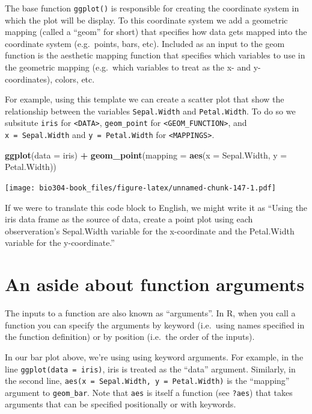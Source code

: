 \documentclass[]{book}
\newenvironment{Shaded}{\begin{snugshade}}{\end{snugshade}}
\newcommand{\DataTypeTok}[1]{\textcolor[rgb]{0.13,0.29,0.53}{#1}}
\newcommand{\KeywordTok}[1]{\textcolor[rgb]{0.13,0.29,0.53}{\textbf{#1}}}
\newcommand{\NormalTok}[1]{#1}
\newcommand{\OperatorTok}[1]{\textcolor[rgb]{0.81,0.36,0.00}{\textbf{#1}}}
\newcommand{\StringTok}[1]{\textcolor[rgb]{0.31,0.60,0.02}{#1}}
\theoremstyle{definition}
\theoremstyle{definition}
\theoremstyle{definition}
\theoremstyle{remark}
\begin{document}
The base function \texttt{ggplot()} is responsible for creating the
coordinate system in which the plot will be display. To this coordinate
system we add a geometric mapping (called a ``geom'' for short) that
specifies how data gets mapped into the coordinate system (e.g.~points,
bars, etc). Included as an input to the geom function is the aesthetic
mapping function that specifies which variables to use in the geometric
mapping (e.g.~which variables to treat as the x- and y-coordinates),
colors, etc.

For example, using this template we can create a scatter plot that show
the relationship between the variables \texttt{Sepal.Width} and
\texttt{Petal.Width}. To do so we subsitute \texttt{iris} for
\texttt{\textless{}DATA\textgreater{}}, \texttt{geom\_point} for
\texttt{\textless{}GEOM\_FUNCTION\textgreater{}}, and
\texttt{x\ =\ Sepal.Width} and \texttt{y\ =\ Petal.Width} for
\texttt{\textless{}MAPPINGS\textgreater{}}.

\begin{Shaded}
\begin{Highlighting}[]
\KeywordTok{ggplot}\NormalTok{(}\DataTypeTok{data =}\NormalTok{ iris) }\OperatorTok{+}
\StringTok{  }\KeywordTok{geom_point}\NormalTok{(}\DataTypeTok{mapping =} \KeywordTok{aes}\NormalTok{(}\DataTypeTok{x =}\NormalTok{ Sepal.Width,  }\DataTypeTok{y =}\NormalTok{ Petal.Width))}
\end{Highlighting}
\end{Shaded}

\texttt{[image: bio304-book\_files/figure-latex/unnamed-chunk-147-1.pdf]}

If we were to translate this code block to English, we might write it as
``Using the iris data frame as the source of data, create a point plot
using each observeration's Sepal.Width variable for the x-coordinate and
the Petal.Width variable for the y-coordinate.''

\hypertarget{an-aside-about-function-arguments}{%
\section{An aside about function
arguments}\label{an-aside-about-function-arguments}}

The inputs to a function are also known as ``arguments''. In R, when you
call a function you can specify the arguments by keyword (i.e.~using
names specified in the function definition) or by position (i.e.~the
order of the inputs).

In our bar plot above, we're using using keyword arguments. For example,
in the line \texttt{ggplot(data\ =\ iris)}, iris is treated as the
``data'' argument. Similarly, in the second line,
\texttt{aes(x\ =\ Sepal.Width,\ y\ =\ Petal.Width)} is the ``mapping''
argument to \texttt{geom\_bar}. Note that \texttt{aes} is itself a
function (see \texttt{?aes}) that takes arguments that can be specified
positionally or with keywords.
\end{document}
